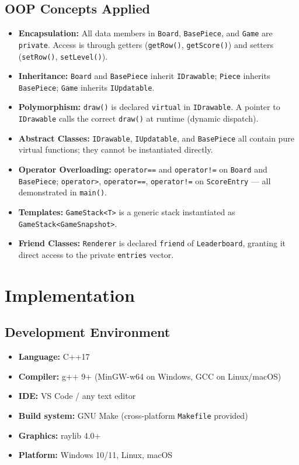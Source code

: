 \documentclass[11pt]{article}
\begin{document}
\subsection{OOP Concepts Applied}

\begin{itemize}
    \item \textbf{Encapsulation:} All data members in \texttt{Board}, \texttt{BasePiece}, and \texttt{Game} are \texttt{private}. Access is through getters (\texttt{getRow()}, \texttt{getScore()}) and setters (\texttt{setRow()}, \texttt{setLevel()}).
    \item \textbf{Inheritance:} \texttt{Board} and \texttt{BasePiece} inherit \texttt{IDrawable}; \texttt{Piece} inherits \texttt{BasePiece}; \texttt{Game} inherits \texttt{IUpdatable}.
    \item \textbf{Polymorphism:} \texttt{draw()} is declared \texttt{virtual} in \texttt{IDrawable}. A pointer to \texttt{IDrawable} calls the correct \texttt{draw()} at runtime (dynamic dispatch).
    \item \textbf{Abstract Classes:} \texttt{IDrawable}, \texttt{IUpdatable}, and \texttt{BasePiece} all contain pure virtual functions; they cannot be instantiated directly.
    \item \textbf{Operator Overloading:} \texttt{operator==} and \texttt{operator!=} on \texttt{Board} and \texttt{BasePiece}; \texttt{operator>}, \texttt{operator==}, \texttt{operator!=} on \texttt{ScoreEntry} --- all demonstrated in \texttt{main()}.
    \item \textbf{Templates:} \texttt{GameStack<T>} is a generic stack instantiated as \texttt{GameStack<GameSnapshot>}.
    \item \textbf{Friend Classes:} \texttt{Renderer} is declared \texttt{friend} of \texttt{Leaderboard}, granting it direct access to the private \texttt{entries} vector.
\end{itemize}

\section{Implementation}

\subsection{Development Environment}
\begin{itemize}
    \item \textbf{Language:} C++17
    \item \textbf{Compiler:} g++ 9+ (MinGW-w64 on Windows, GCC on Linux/macOS)
    \item \textbf{IDE:} VS Code / any text editor
    \item \textbf{Build system:} GNU Make (cross-platform \texttt{Makefile} provided)
    \item \textbf{Graphics:} raylib 4.0+
    \item \textbf{Platform:} Windows 10/11, Linux, macOS
\end{itemize}
\end{document}
